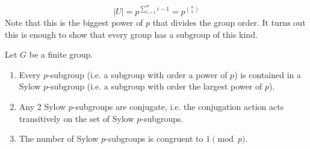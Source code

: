 \[ |U| = p^{\sum_{i = 1}^n i - 1} = p^{\binom{n}{2}} \]
Note that this is the biggest power of $p$ that divides the group order.
It turns out this is enough to show that every group has a subgroup of this kind.
\begin{theorem}
    Let $G$ be a finite group.
    \begin{enumerate}
        \item Every $p$-subgroup (i.e. a subgroup with order a power of $p$)
        is contained in a Sylow $p$-subgroup (i.e. a subgroup with order the largest power of $p$).
        \item Any 2 Sylow $p$-subgroups are conjugate, i.e. the conjugation action acts transitively on the set of Sylow $p$-subgroups.
        \item The number of Sylow $p$-subgroups is congruent to $1 \pmod{p}$.
    \end{enumerate}
\end{theorem}
